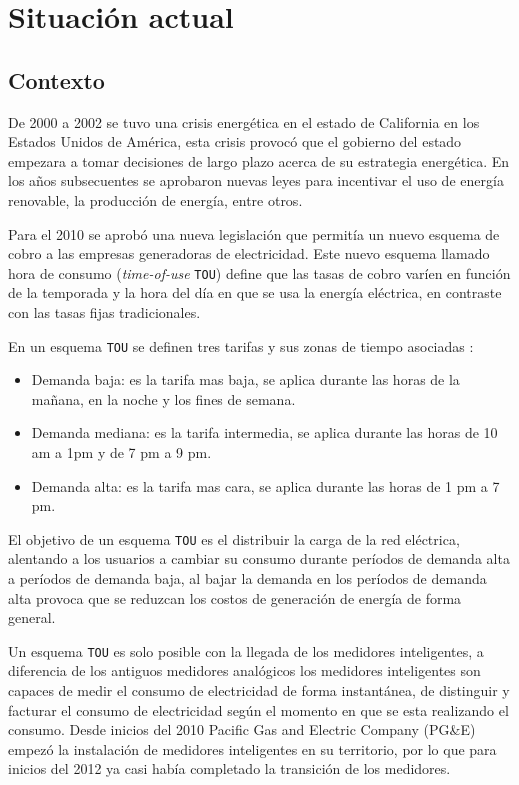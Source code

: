 \chapter{Situación actual}

\section{Contexto}
De 2000 a 2002 se tuvo una crisis energética en el estado de California en los
Estados Unidos de América, esta crisis provocó que el gobierno del estado empezara a
tomar decisiones de largo plazo acerca de su estrategia energética. En los años
subsecuentes se aprobaron nuevas leyes para incentivar el uso de energía renovable,
la producción de energía, entre otros.

Para el 2010 se aprobó una nueva legislación que permitía un nuevo esquema
de cobro a las empresas generadoras de electricidad. Este nuevo esquema
llamado hora de consumo (\textit{time-of-use} \texttt{TOU}) define que las
tasas de cobro varíen en función de la temporada y la hora del día en que
se usa la energía eléctrica, en contraste con las tasas fijas tradicionales.

\vspace{2.5mm}

En un esquema \texttt{TOU} se definen tres tarifas y sus zonas de tiempo asociadas
\cite{16_pge_time_of_use_2015}:

\begin{itemize}
\item  Demanda baja: es la tarifa mas baja, se aplica durante las horas de la
  mañana, en la noche y los fines de semana.
\item Demanda mediana: es la tarifa intermedia, se aplica durante las horas de
  10 am a 1pm y de 7 pm a 9 pm.
\item Demanda alta: es la tarifa mas cara, se aplica durante las horas de
  1 pm a 7 pm.
\end{itemize}

El objetivo de un esquema \texttt{TOU} es el distribuir la carga de la red
eléctrica, alentando a los usuarios a cambiar su consumo durante períodos
de demanda alta a períodos de demanda baja, al bajar la demanda en los períodos
de demanda alta provoca que se reduzcan los costos de generación de energía de
forma general.

Un esquema \texttt{TOU} es solo posible con la llegada de los medidores
inteligentes, a diferencia de los antiguos medidores analógicos los medidores
inteligentes son capaces de medir el consumo de electricidad de forma instantánea,
de distinguir y facturar el consumo de electricidad según el momento en que se
esta realizando el consumo. Desde inicios del 2010 Pacific Gas and
Electric Company (PG\&E) empezó la instalación de medidores inteligentes
en su territorio, por lo que para inicios del 2012 ya casi había
completado la transición de los medidores.

